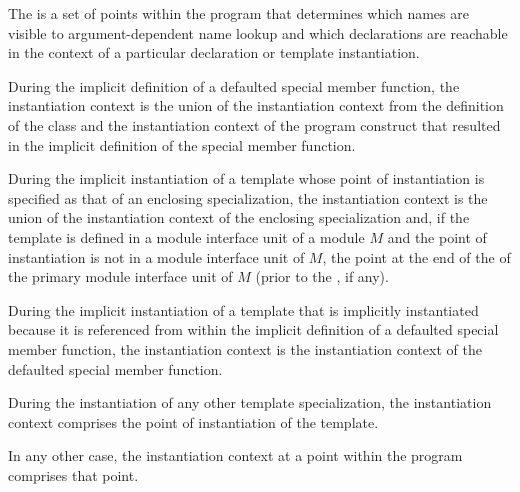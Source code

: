 \pnum
The  is a set of points within the program
that determines which names are visible
to argument-dependent name lookup
and which declarations are reachable
in the context of a particular declaration or template instantiation.

\pnum
During the implicit definition of
a defaulted special member function,
the instantiation context is the union of
the instantiation context from the definition of the class and
the instantiation context of the program construct that
resulted in the implicit definition of the special member function.

\pnum
During the implicit instantiation of a template
whose point of instantiation is specified as
that of an enclosing specialization,
the instantiation context is the union of
the instantiation context of the enclosing specialization and,
if the template is defined in a module interface unit of a module $M$
and the point of instantiation is not in a module interface unit of $M$,
the point at the end of the
 of the
primary module interface unit of $M$
(prior to the , if any).

\pnum
During the implicit instantiation of a template
that is implicitly instantiated because it is referenced
from within the implicit definition of a defaulted special member function,
the instantiation context is the instantiation context of
the defaulted special member function.

\pnum
During the instantiation of any other template specialization,
the instantiation context comprises the point of instantiation
of the template.

\pnum
In any other case, the instantiation context
at a point within the program
comprises that point.


